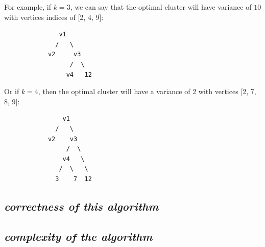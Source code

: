 \documentclass[11pt,a4paper,english]{article}
\begin{document}
        For example, if $k=3$, we can say that the optimal cluster will have variance of $10$ with vertices indices of [2, 4, 9]:
        \begin{verbatim}
               v1
              /   \
            v2     v3
                  /  \
                 v4   12
        \end{verbatim}

        Or if $k=4$, then the optimal cluster will have a variance of 2 with vertices [2, 7, 8, 9]:
        \begin{verbatim}
                v1
              /   \
            v2    v3
                 /  \
                v4   \
               /  \   \
              3    7  12
        \end{verbatim}

      \subsection{
        \textit{correctness of this algorithm}
      }

      \subsection{
        \textit{complexity of the algorithm}
      }
\end{document}
